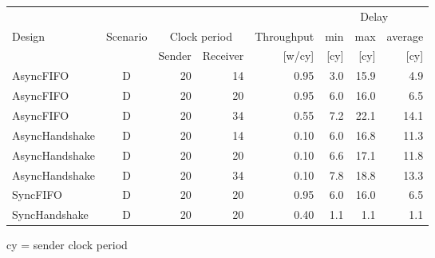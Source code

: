 % 
% 
\begin{tabular}{lc|*{6}{r}}
  & & & & & \multicolumn{3}{c}{Delay}\\
 Design & Scenario & \multicolumn{2}{c}{Clock period} & Throughput &  min & max & average \\
  & & Sender & Receiver & [w/cy] & [cy] & [cy] & [cy] \\
\hline
 AsyncFIFO & D &  20 & 14 & 0.95  & 3.0 & 15.9 & 4.9 \\[0ex]
 AsyncFIFO & D &  20 & 20 & 0.95  & 6.0 & 16.0 & 6.5 \\[0ex]
 AsyncFIFO & D &  20 & 34 & 0.55  & 7.2 & 22.1 & 14.1 \\[0ex]
\hline
 AsyncHandshake & D &  20 & 14 & 0.10  & 6.0 & 16.8 & 11.3 \\[0ex]
 AsyncHandshake & D &  20 & 20 & 0.10  & 6.6 & 17.1 & 11.8 \\[0ex]
 AsyncHandshake & D &  20 & 34 & 0.10  & 7.8 & 18.8 & 13.3 \\[0ex]
\hline
 SyncFIFO & D &  20 & 20 & 0.95  & 6.0 & 16.0 & 6.5 \\[0ex]
\hline
 SyncHandshake & D &  20 & 20 & 0.40  & 1.1 & 1.1 & 1.1 \\[0ex]
\hline
\end{tabular}
 
cy = sender clock period
 
